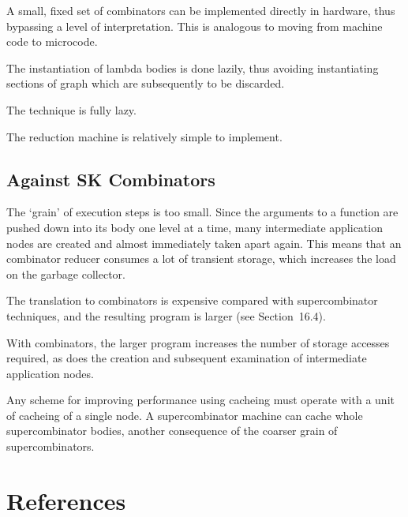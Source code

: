 \begin{numbered}
    \item A small, fixed set of combinators can be implemented directly in hardware, thus bypassing a level of interpretation. This is analogous to moving from machine code to microcode.
    \item The instantiation of lambda bodies is done lazily, thus avoiding instantiating sections of graph which are subsequently to be discarded.
    \item The technique is fully lazy.
    \item The reduction machine is relatively simple to implement.
\end{numbered}

\subsection{Against {\sffamily SK} Combinators}

\begin{numbered}
    \item The `grain' of execution steps is too small. Since the arguments to a function are pushed down into its body one level at a time, many intermediate application nodes are created and almost immediately taken apart again. This means that an  combinator reducer consumes a lot of transient storage, which increases the load on the garbage collector.
    \item The translation to combinators is expensive compared with supercombinator techniques, and the resulting program is larger (see Section~16.4).
    \item With  combinators, the larger program increases the number of storage accesses required, as does the creation and subsequent examination of intermediate application nodes.
    \item Any scheme for improving performance using cacheing must operate with a unit of cacheing of a single node. A supercombinator machine can cache whole supercombinator bodies, another consequence of the coarser grain of supercombinators.
\end{numbered}

\section*{References}

